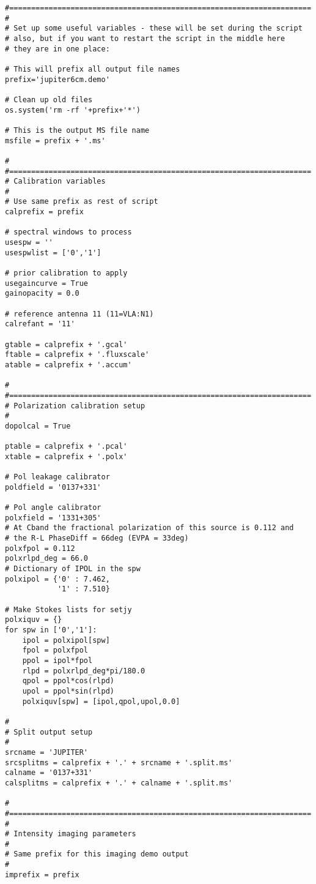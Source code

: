\begin{verbatim}
#=====================================================================
#
# Set up some useful variables - these will be set during the script
# also, but if you want to restart the script in the middle here
# they are in one place:

# This will prefix all output file names
prefix='jupiter6cm.demo'

# Clean up old files
os.system('rm -rf '+prefix+'*')

# This is the output MS file name
msfile = prefix + '.ms'

#
#=====================================================================
# Calibration variables
#
# Use same prefix as rest of script
calprefix = prefix

# spectral windows to process
usespw = ''
usespwlist = ['0','1']

# prior calibration to apply
usegaincurve = True
gainopacity = 0.0

# reference antenna 11 (11=VLA:N1)
calrefant = '11'

gtable = calprefix + '.gcal'
ftable = calprefix + '.fluxscale'
atable = calprefix + '.accum'

#
#=====================================================================
# Polarization calibration setup
#
dopolcal = True

ptable = calprefix + '.pcal'
xtable = calprefix + '.polx'

# Pol leakage calibrator
poldfield = '0137+331'

# Pol angle calibrator
polxfield = '1331+305'
# At Cband the fractional polarization of this source is 0.112 and
# the R-L PhaseDiff = 66deg (EVPA = 33deg)
polxfpol = 0.112
polxrlpd_deg = 66.0
# Dictionary of IPOL in the spw
polxipol = {'0' : 7.462,
            '1' : 7.510}

# Make Stokes lists for setjy
polxiquv = {}
for spw in ['0','1']:
    ipol = polxipol[spw]
    fpol = polxfpol
    ppol = ipol*fpol
    rlpd = polxrlpd_deg*pi/180.0
    qpol = ppol*cos(rlpd)
    upol = ppol*sin(rlpd)
    polxiquv[spw] = [ipol,qpol,upol,0.0]

#
# Split output setup
#
srcname = 'JUPITER'
srcsplitms = calprefix + '.' + srcname + '.split.ms'
calname = '0137+331'
calsplitms = calprefix + '.' + calname + '.split.ms'

#
#=====================================================================
#
# Intensity imaging parameters
#
# Same prefix for this imaging demo output
#
imprefix = prefix


\end{verbatim}
